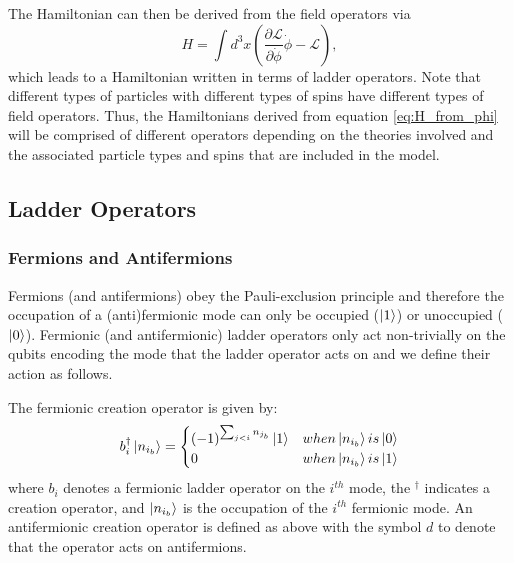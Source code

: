 The Hamiltonian can then be derived from the field operators via 
\begin{equation}
    \label{eq:H_from_phi}
    H = \int d^3x \left(\frac{\partial \mathcal{L}}{\partial \dot{\phi}}\dot{\phi} - \mathcal{L} \right),
\end{equation}
which leads to a Hamiltonian written in terms of ladder operators.
Note that different types of particles with different types of spins have different types of field operators.
Thus, the Hamiltonians derived from equation \ref{eq:H_from_phi} will be comprised of different operators depending on the theories involved and the associated particle types and spins that are included in the model. 

\subsection{Ladder Operators}
\label{subsec:operators}

\subsubsection{Fermions and Antifermions}

Fermions (and antifermions) obey the Pauli-exclusion principle \cite{pauli1925zusammenhang} and therefore the occupation of a (anti)fermionic mode can only be occupied ($\ket{1}$) or unoccupied ($\ket{0}$).
Fermionic (and antifermionic) ladder operators only act non-trivially on the qubits encoding the mode that the ladder operator acts on and we define their action as follows.

The fermionic creation operator is given by:
\begin{equation}
    \label{eq:fermionic-creation}
    b_i^\dagger \ket{n_{i_b}} = 
    \begin{cases} 
        (-1)^{\sum_{j < i} n_{j_b}} \ket{1}  & when \ket{n_{i_b}} is \ket{0} \\
        0 & when \ket{n_{i_b}} is \ket{1}
    \end{cases}
\end{equation}
where $b_i$ denotes a fermionic ladder operator on the $i^{th}$ mode, the $^\dagger$ indicates a creation operator, and $\ket{n_{i_b}}$ is the occupation of the $i^{th}$ fermionic mode.
An antifermionic creation operator is defined as above with the symbol $d$ to denote that the operator acts on antifermions.


